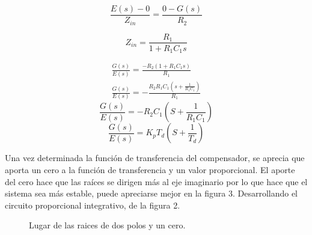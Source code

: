 \documentclass[10pt, a4paper]{report}
\begin{document}
    \begin{equation}
      \frac{E(s)-0}{Z_{in}}=\frac{0-G(s)}{R_2}
    \end{equation}

    \begin{equation}
      Z_{in}=\frac{R_1}{1+R_1 C_1 s}
    \end{equation}

    \begin{equation*}
      \begin{split}
      \frac{G(s)}{E(s)}=\frac{-R_2(1+R_1 C_1 s)}{R_1} \\
      \frac{G(s)}{E(s)}=-\frac{R_2 R_1 C_1(s+ \frac{1}{R_1 C_1})}{R_1}
      \end{split}
    \end{equation*}
       \begin{equation}
        \frac{G(s)}{E(s)}=-R_2 C_1 (S +\frac{1}{R_1 C_1})
       \end{equation}
    \begin{equation}
      \frac{G(s)}{E(s)}= K_{p} T_{d}(S+\frac{1}{T_{d}})
    \end{equation}

    Una vez determinada la función de transferencia del compensador, se aprecia que aporta un cero a la función de transferencia y un valor proporcional. El aporte del cero hace que las raíces se dirigen más al eje imaginario por lo que hace que el sistema sea más estable, puede apreciarse mejor en la figura 3.
Desarrollando el circuito proporcional integrativo, de la figura 2.


\begin{figure}[h]
  \centering
  \caption{Lugar de las raices de dos polos y un cero.}
\end{figure}
\end{document}
